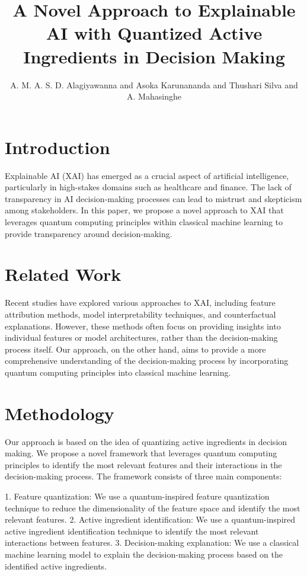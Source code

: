 \documentclass{article}
\begin{document}
\title{A Novel Approach to Explainable AI with Quantized Active Ingredients in Decision Making}

\author{A. M. A. S. D. Alagiyawanna and Asoka Karunananda and Thushari Silva and A. Mahasinghe}

\maketitle

\section{Introduction}
\label{sec:intro}

Explainable AI (XAI) has emerged as a crucial aspect of artificial intelligence, particularly in high-stakes domains such as healthcare and finance. The lack of transparency in AI decision-making processes can lead to mistrust and skepticism among stakeholders. In this paper, we propose a novel approach to XAI that leverages quantum computing principles within classical machine learning to provide transparency around decision-making.

\section{Related Work}
\label{sec:relatedwork}

Recent studies have explored various approaches to XAI, including feature attribution methods, model interpretability techniques, and counterfactual explanations. However, these methods often focus on providing insights into individual features or model architectures, rather than the decision-making process itself. Our approach, on the other hand, aims to provide a more comprehensive understanding of the decision-making process by incorporating quantum computing principles into classical machine learning.

\section{Methodology}
\label{sec:methodology}

Our approach is based on the idea of quantizing active ingredients in decision making. We propose a novel framework that leverages quantum computing principles to identify the most relevant features and their interactions in the decision-making process. The framework consists of three main components:

1.  Feature quantization: We use a quantum-inspired feature quantization technique to reduce the dimensionality of the feature space and identify the most relevant features.
2.  Active ingredient identification: We use a quantum-inspired active ingredient identification technique to identify the most relevant interactions between features.
3.  Decision-making explanation: We use a classical machine learning model to explain the decision-making process based on the identified active ingredients.
\end{document}
